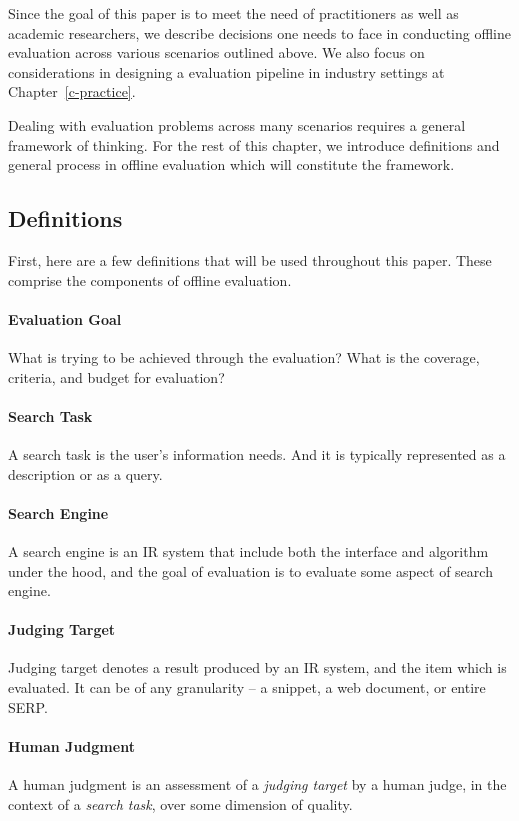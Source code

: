 Since the goal of this paper is to meet the need of practitioners as well as academic researchers, we describe decisions one needs to face in conducting offline evaluation across various scenarios outlined above. We also focus on considerations in designing a evaluation pipeline in industry settings at Chapter~\ref{c-practice}.

Dealing with evaluation problems across many scenarios requires a general framework of thinking. For the rest of this chapter, we introduce definitions and general process in offline evaluation which will constitute the framework.

\subsection{Definitions}

First, here are a few definitions that will be used throughout this paper. These comprise the components of offline evaluation.

\paragraph{Evaluation Goal} What is trying to be achieved through the evaluation? What is the coverage, criteria, and budget for evaluation?

\paragraph{Search Task}  A search task is the user's information needs. And it is typically represented as a description or as a query.

\paragraph{Search Engine} A search engine is an IR system that include both the interface and algorithm under the hood, and the goal of evaluation is to evaluate some aspect of search engine.

\paragraph{Judging Target} Judging target denotes a result produced by an IR system, and the item which is evaluated. It can be of any granularity -- a snippet, a web document, or entire SERP. 

\paragraph{Human Judgment} A human judgment is an assessment of a \textit{judging target} by a human judge, in the context of a \textit{search task}, over some dimension of quality. 

